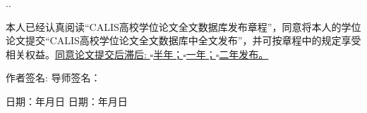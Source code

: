 \begin{center}
.\dotfill .
\parbox[t][2.2cm][c]{\textwidth}{{
\hspace{2em}本人已经认真阅读“CALIS高校学位论文全文数据库发布章程”，同意将本人的学位论文提交“CALIS高校学位论文全文数据库中全文发布”，并可按章程中的规定享受相关权益。\underline{同意论文提交后滞后:
      $\square$半年；$\square$一年；$\square$二年发布。}}}
   \parbox[t][1.8cm][c]{\textwidth}{
   \hspace{2em}\fangsong   作者签名:   \hspace*{5.3cm}   导师签名：}
   \parbox[t][0.1cm][c]{\textwidth}{
   \hspace{2em}\fangsong 日期：\underline{\hspace{3em}}年\underline{\hspace{2em}}月\underline{\hspace{2em}}日
    \hspace*{1.4cm}日期：\underline{\hspace{3em}}年\underline{\hspace{2em}}月\underline{\hspace{2em}}日
    }
    \end{center}
